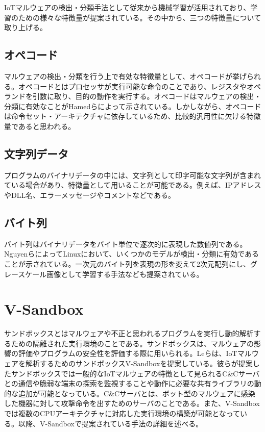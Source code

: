 \documentclass[12pt,a4paper,titlepage,report]{jsbook}
\begin{document}
IoTマルウェアの検出・分類手法として従来から機械学習が活用されており、学習のための様々な特徴量\cite{malwaresurvey}が提案されている。その中から、三つの特徴量について取り上げる。

\subsection{オペコード}
マルウェアの検出・分類を行う上で有効な特徴量として、オペコードが挙げられる。オペコードとはプロセッサが実行可能な命令のことであり、レジスタやオペランドを引数に取り、目的の動作を実行する。オペコードはマルウェアの検出・分類に有効なことがHamedらによって示されている\cite{opcode}。しかしながら、オペコードは命令セット・アーキテクチャに依存しているため、比較的汎用性に欠ける特徴量であると思われる。

\subsection{文字列データ}
プログラムのバイナリデータの中には、文字列として印字可能な文字列が含まれている場合があり、特徴量として用いることが可能である。例えば、IPアドレスやDLL名、エラーメッセージやコメントなどである。

\subsection{バイト列}
バイト列はバイナリデータをバイト単位で逐次的に表現した数値列である。NguyenらによってLinuxにおいて、いくつかのモデルが検出・分類に有効であることが示されている\cite{bytelinux}。一次元のバイト列を表現の形を変えて2次元配列にし、グレースケール画像として学習する手法なども提案されている\cite{malwaresurvey}。

\section{V-Sandbox}
サンドボックスとはマルウェアや不正と思われるプログラムを実行し動的解析するための隔離された実行環境のことである。サンドボックスは、マルウェアの影響の評価やプログラムの安全性を評価する際に用いられる。Leらは、IoTマルウェアを解析するためのサンドボックスV-Sandboxを提案している\cite{vsandbox}。彼らが提案したサンドボックスでは一般的なIoTマルウェアの特徴として見られるC\&Cサーバとの通信や脆弱な端末の探索を監視することや動作に必要な共有ライブラリの動的な追加が可能となっている。C\&Cサーバとは、ボット型のマルウェアに感染した機器に対して攻撃命令を出すためのサーバのことである。また、V-Sandboxでは複数のCPUアーキテクチャに対応した実行環境の構築が可能となっている。以降、V-Sandboxで提案されている手法の詳細を述べる。
\end{document}
